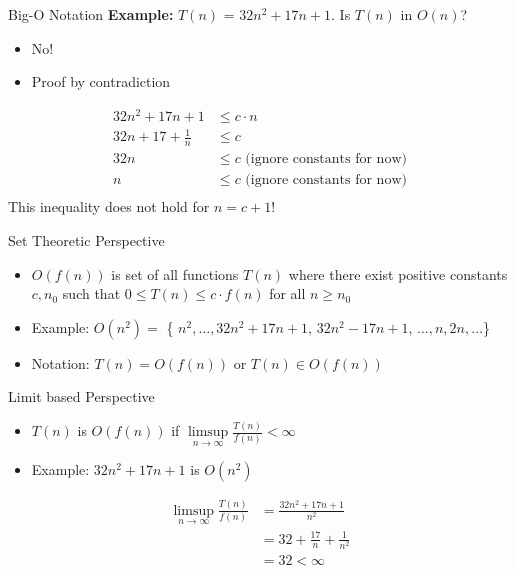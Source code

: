 \documentclass{beamer}
\begin{document}
\begin{frame}{Big-O Notation}
\textbf{Example:} $T(n)$ = $32n^2+17n+1$.  Is $T(n)$ in $O(n)$? 
\begin{itemize}
\item No!
\item Proof by contradiction
\end{itemize}
\begin{align*}
32n^2+17n+1 &\leq c \cdot n\\
32n+17+\frac{1}{n} &\leq c \\
32n &\leq c \text{ (ignore constants for now)} \\
n &\leq c \text{ (ignore constants for now)} \\
\end{align*}
This inequality does not hold for $n=c+1$!
\end{frame}



\begin{frame}{Set Theoretic Perspective}
\begin{itemize}
\item $O(f(n))$ is set of all functions $T(n)$ where there exist positive constants $c, n_0$ 
such that $0 \leq T(n) \leq c \cdot f(n)$ for all $n \geq n_0$
\item Example: $O(n^2)=$ \{ $n^2, \ldots, 32n^2+17n+1$, $32n^2-17n+1$, $\ldots, n, 2n, \ldots $\}
\item Notation: $T(n)=O(f(n))$ or $T(n) \in O(f(n))$
\end{itemize}
\end{frame}


\begin{frame}{Limit based Perspective}
\begin{itemize}
\item $T(n)$ is $O(f(n))$ if $\limsup\limits_{n \rightarrow \infty} \frac{T(n)}{f(n)} < \infty$ 
\item Example: $32n^2+17n+1$ is $O(n^2)$
\end{itemize}
\begin{align*}
\limsup\limits_{n \rightarrow \infty} \frac{T(n)}{f(n)} &= \frac{32n^2+17n+1}{n^2} \\
&= 32 + \frac{17}{n} + \frac{1}{n^2} \\
&= 32 < \infty
\end{align*}
\end{frame}
\end{document}
